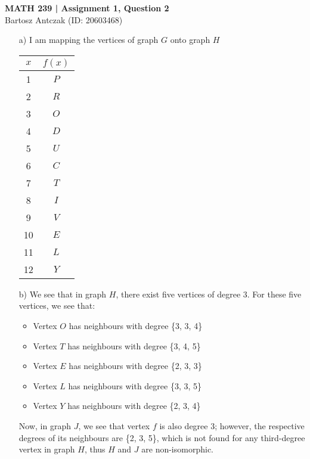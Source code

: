 \documentclass{report}
\begin{document}
\noindent \textbf{MATH 239 | Assignment 1, Question 2}\\
Bartosz Antczak (ID: 20603468)
\onehalfspacing
\begin{enumerate}
\item[a)] 
I am mapping the vertices of graph $G$ onto graph $H$\\
\begin{center}
\begin{tabular}{ c | c }
$x$ & $f(x)$ \\ \hline
1 & $P$ \\ \hline
2 & $R$ \\ \hline
3 & $O$ \\ \hline
4 & $D$ \\ \hline
5 & $U$ \\ \hline
6 & $C$ \\ \hline
7 & $T$ \\ \hline
8 & $I$ \\ \hline
9 & $V$ \\ \hline
10 & $E$ \\ \hline
11 & $L$ \\ \hline
12 & $Y$
\end{tabular}
\end{center}
\item[b)] We see that in graph $H$, there exist five vertices of degree 3. For these five vertices, we see that:
\begin{itemize}
\item Vertex $O$ has neighbours with degree \{3, 3, 4\}
\item Vertex $T$ has neighbours with degree \{3, 4, 5\}
\item Vertex $E$ has neighbours with degree \{2, 3, 3\}
\item Vertex $L$ has neighbours with degree \{3, 3, 5\}
\item Vertex $Y$ has neighbours with degree \{2, 3, 4\}
\end{itemize}
Now, in graph $J$, we see that vertex $f$ is also degree 3; however, the respective degrees of its neighbours are \{2, 3, 5\}, which is not found for any third-degree vertex in graph $H$, thus $H$ and $J$ are non-isomorphic.
\end{enumerate}
\end{document}

